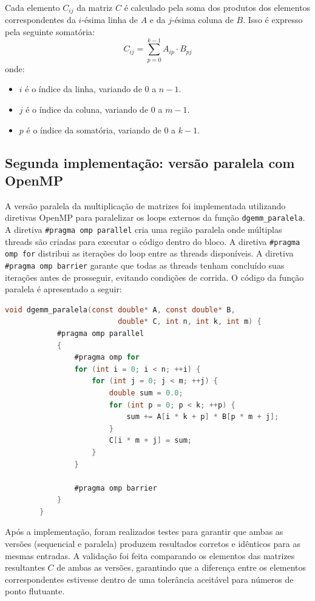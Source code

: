 \documentclass[12pt, a4paper]{article}
\begin{document}
	Cada elemento $C_{ij}$ da matriz $C$ é calculado pela soma dos produtos dos
	elementos correspondentes da $i$-ésima linha de $A$ e da $j$-ésima coluna de
	$B$. Isso é expresso pela seguinte somatória:
	\[
		C_{ij}= \sum_{p=0}^{k-1}A_{ip}\cdot B_{pj}
	\]
	onde:
	\begin{itemize}
		\item $i$ é o índice da linha, variando de $0$ a $n-1$.

		\item $j$ é o índice da coluna, variando de $0$ a $m-1$.

		\item $p$ é o índice da somatória, variando de $0$ a $k-1$.
	\end{itemize}

	\subsection{Segunda implementação: versão paralela com OpenMP}

	A versão paralela da multiplicação de matrizes foi implementada utilizando
	diretivas OpenMP para paralelizar os loops externos da função \texttt{dgemm\_paralela}.
	A diretiva \texttt{\#pragma omp parallel} cria uma região paralela onde múltiplas threads são
	criadas para executar o código dentro do bloco. A diretiva \texttt{\#pragma omp for} distribui 
	as iterações do loop entre as threads disponíveis. A diretiva \texttt{\#pragma omp barrier} garante que todas as threads
	tenham concluído suas iterações antes de prosseguir, evitando condições de corrida. O código da função paralela 
	é apresentado a seguir:

	\begin{lstlisting}[language=C]
		void dgemm_paralela(const double* A, const double* B, 
						  double* C, int n, int k, int m) {
			#pragma omp parallel
			{
				#pragma omp for
				for (int i = 0; i < n; ++i) {
					for (int j = 0; j < m; ++j) {
						double sum = 0.0;
						for (int p = 0; p < k; ++p) {
							sum += A[i * k + p] * B[p * m + j];
						}
						C[i * m + j] = sum;
					}
				}

				#pragma omp barrier
			}
		}
	\end{lstlisting}

	Após a implementação, foram realizados testes para garantir que ambas as versões
	(sequencial e paralela) produzem resultados corretos e idênticos para as mesmas
	entradas. A validação foi feita comparando os elementos das matrizes resultantes
	$C$ de ambas as versões, garantindo que a diferença entre os elementos correspondentes
	estivesse dentro de uma tolerância aceitável para números de ponto flutuante.
\end{document}

